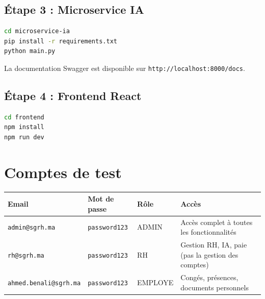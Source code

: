 \documentclass[a4paper,12pt]{report}
\begin{document}
\subsection{Étape 3 : Microservice IA}
\begin{lstlisting}[language=bash,title={Lancement du microservice IA (port 8000)}]
cd microservice-ia
pip install -r requirements.txt
python main.py
\end{lstlisting}
La documentation Swagger est disponible sur \texttt{http://localhost:8000/docs}.

\subsection{Étape 4 : Frontend React}
\begin{lstlisting}[language=bash,title={Lancement du frontend (port 3000)}]
cd frontend
npm install
npm run dev
\end{lstlisting}

\section{Comptes de test}

\begin{center}
\begin{tabularx}{\textwidth}{|l|l|l|X|}
\hline
\textbf{Email} & \textbf{Mot de passe} & \textbf{Rôle} & \textbf{Accès} \\
\hline
\texttt{admin@sgrh.ma} & \texttt{password123} & ADMIN & Accès complet à toutes les fonctionnalités \\
\hline
\texttt{rh@sgrh.ma} & \texttt{password123} & RH & Gestion RH, IA, paie (pas la gestion des comptes) \\
\hline
\texttt{ahmed.benali@sgrh.ma} & \texttt{password123} & EMPLOYE & Congés, présences, documents personnels \\
\hline
\end{tabularx}
\end{center}
\end{document}
